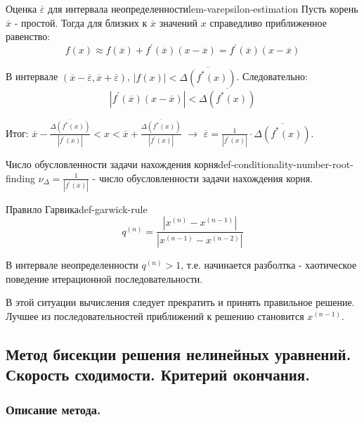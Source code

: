 \documentclass[14pt]{extarticle}
\begin{document}
        \begin{lemma}{Оценка $\overline{\varepsilon}$ для интервала неопределенности}{lem-varepsilon-estimation}
            Пусть корень $\overline{x}$ - простой. Тогда для близких к $\overline{x}$ значений $x$ справедливо приближенное равенство:
            $$f(x) \approx f(\overline{x}) + f^{'}(\overline{x})(x - \overline{x}) = f^{'}(\overline{x})(x - \overline{x})$$
        
            В интервале $(\overline{x} - \overline{\varepsilon}, \overline{x} + \overline{\varepsilon})$, $|f(x)| < \overline{\Delta(f^{*}(x))}$. Следовательно:
            $$|f^{'}(\overline{x})(x - \overline{x})| < \overline{\Delta(f^{*}(x))}$$

            Итог: $\overline{x} - \frac{\overline{\Delta(f^{*}(x))}}{|f^{'}(x)|} < x < \overline{x} + \frac{\overline{\Delta(f^{*}(x))}}{|f^{'}(x)|}$ $\rightarrow$ $\overline{\varepsilon} = \frac{1}{|f^{'}(x)|} \cdot \overline{\Delta(f^{*}(x))}$.
        \end{lemma}

        \begin{definition}{Число обусловленности задачи нахождения корня}{def-conditionality-number-root-finding}
            $\nu_{\Delta} = \frac{1}{|f^{'}(\overline{x})|}$ - число обусловленности задачи нахождения корня.
        \end{definition}

        \begin{definition}{Правило Гарвика}{def-garwick-rule}
            $$q^{(n)} = \frac{|x^{(n)} - x^{(n - 1)}|}{|x^{(n - 1)} - x^{(n - 2)}|}$$

            В интервале неопределенности $q^{(n)} > 1$, т.е. начинается разболтка - хаотическое поведение итерационной последовательности.

            \vspace{\baselineskip}

            В этой ситуации вычисления следует прекратить и принять правильное решение. Лучшее из последовательностей приближений к решению становится $x^{(n-1)}$.
        \end{definition}

\clearpage
\subsection{Метод бисекции решения нелинейных уравнений. Скорость сходимости. Критерий окончания.}

    \subsubsection{Описание метода.}
\end{document}
